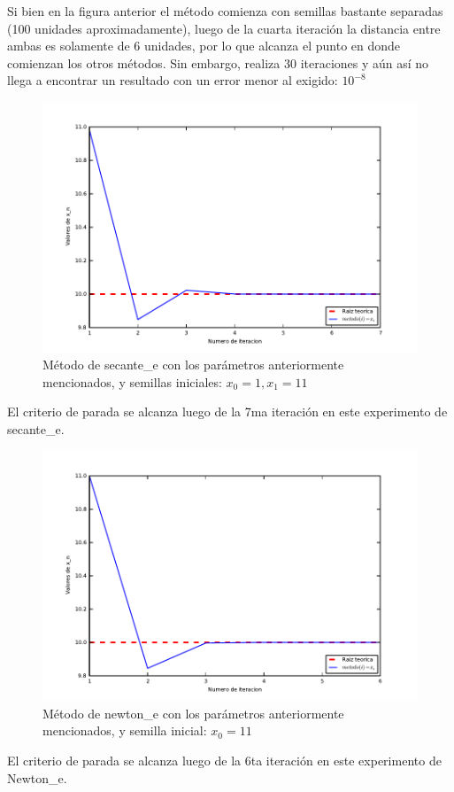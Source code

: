Si bien en la figura anterior el método comienza con semillas bastante separadas (100 unidades aproximadamente), luego de la cuarta iteración la distancia entre ambas es solamente de 6 unidades, por lo que
alcanza el punto en donde comienzan los otros métodos. Sin embargo, realiza 30 iteraciones y aún así no llega a encontrar un resultado con un error menor al exigido: $10^{-8}$

\begin{figure}[!h]
	\begin{center}
		  \includegraphics[keepaspectratio]{../Imagenes/exp2/secante_e.pdf}
		  \caption{Método de secante\_e con los parámetros anteriormente mencionados, y semillas iniciales: $x_0=1, x_1=11$ }
		  \label{fig:contra1}
	\end{center}
\end{figure}
\FloatBarrier

El criterio de parada se alcanza luego de la 7ma iteración en este experimento de secante\_e.

\begin{figure}[!h]
	\begin{center}
		  \includegraphics[keepaspectratio]{../Imagenes/exp2/newton_e.pdf}
		  \caption{Método de newton\_e con los parámetros anteriormente mencionados, y semilla inicial: $x_0=11$}
		  \label{fig:contra1}
	\end{center}
\end{figure}
\FloatBarrier

El criterio de parada se alcanza luego de la 6ta iteración en este experimento de Newton\_e.